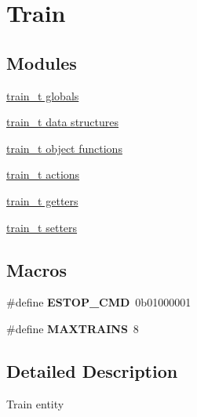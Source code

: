 \hypertarget{group__train}{\section{Train}
\label{group__train}
}
\subsection*{Modules}
\begin{DoxyCompactItemize}
\item 
\hyperlink{group__train__t__globals}{train\-\_\-t globals}
\item 
\hyperlink{group__train__t__structs}{train\-\_\-t data structures}
\item 
\hyperlink{group__train__t__object}{train\-\_\-t object functions}
\item 
\hyperlink{group__train__t__actions}{train\-\_\-t actions}
\item 
\hyperlink{group__train__t__getters}{train\-\_\-t getters}
\item 
\hyperlink{group__train__t__setters}{train\-\_\-t setters}
\end{DoxyCompactItemize}
\subsection*{Macros}
\begin{DoxyCompactItemize}
\item 
\hypertarget{group__train_gaac036488e813752aaf5d26dbb6e3323d}{\#define {\bfseries E\-S\-T\-O\-P\-\_\-\-C\-M\-D}~0b01000001}\label{group__train_gaac036488e813752aaf5d26dbb6e3323d}

\item 
\hypertarget{group__train_ga4acffc7a5a3b76cbeb0935021bfd8a10}{\#define {\bfseries M\-A\-X\-T\-R\-A\-I\-N\-S}~8}\label{group__train_ga4acffc7a5a3b76cbeb0935021bfd8a10}

\end{DoxyCompactItemize}


\subsection{Detailed Description}
Train entity 